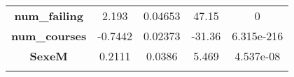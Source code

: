 \documentclass[]{book}
\theoremstyle{definition}
\theoremstyle{definition}
\theoremstyle{remark}
\begin{document}
\begin{longtable}[]{@{}ccccc@{}}
\begin{minipage}[t]{0.30\columnwidth}\centering\strut
\textbf{num\_failing}\strut
\end{minipage} & \begin{minipage}[t]{0.13\columnwidth}\centering\strut
2.193\strut
\end{minipage} & \begin{minipage}[t]{0.16\columnwidth}\centering\strut
0.04653\strut
\end{minipage} & \begin{minipage}[t]{0.12\columnwidth}\centering\strut
47.15\strut
\end{minipage} & \begin{minipage}[t]{0.12\columnwidth}\centering\strut
0\strut
\end{minipage}\tabularnewline
\begin{minipage}[t]{0.30\columnwidth}\centering\strut
\textbf{num\_courses}\strut
\end{minipage} & \begin{minipage}[t]{0.13\columnwidth}\centering\strut
-0.7442\strut
\end{minipage} & \begin{minipage}[t]{0.16\columnwidth}\centering\strut
0.02373\strut
\end{minipage} & \begin{minipage}[t]{0.12\columnwidth}\centering\strut
-31.36\strut
\end{minipage} & \begin{minipage}[t]{0.12\columnwidth}\centering\strut
6.315e-216\strut
\end{minipage}\tabularnewline
\begin{minipage}[t]{0.30\columnwidth}\centering\strut
\textbf{SexeM}\strut
\end{minipage} & \begin{minipage}[t]{0.13\columnwidth}\centering\strut
0.2111\strut
\end{minipage} & \begin{minipage}[t]{0.16\columnwidth}\centering\strut
0.0386\strut
\end{minipage} & \begin{minipage}[t]{0.12\columnwidth}\centering\strut
5.469\strut
\end{minipage} & \begin{minipage}[t]{0.12\columnwidth}\centering\strut
4.537e-08\strut
\end{minipage}\tabularnewline
\begin{minipage}[t]{0.30\columnwidth}\centering\strut

\end{minipage}
\end{longtable}
\end{document}
